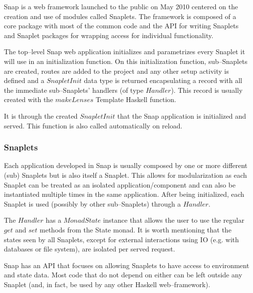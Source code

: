 Snap is a web framework launched to the public on May 2010 centered on the creation and use of modules called Snaplets.
The framework is composed of a core package with most of the common code and the API for writing Snaplets and Snaplet packages for wrapping access for individual functionality.

The top--level Snap web application initializes and parametrizes every Snaplet it will use in an initialization function.
On this initialization function, sub--Snaplets are created, routes are added to the project and any other setup activity is defined and a $ SnapletInit $ data type is returned encapsulating a record with all the immediate sub--Snaplets' handlers (of type $ Handler $).
This record is usually created with the $ makeLenses $ Template Haskell function.

It is through the created $ SnapletInit $ that the Snap application is initialized and served.
This function is also called automatically on reload.

\subsubsection{Snaplets}

Each application developed in Snap is usually composed by one or more different (sub) Snaplets but is also itself a Snaplet.
This allows for modularization as each Snaplet can be treated as an isolated application/component and can also be instantiated multiple times in the same application.
After being initialized, each Snaplet is used (possibly by other sub--Snaplets) through a $ Handler $.

The $ Handler $ has a $ MonadState $ instance that allows the user to use the regular $ get $ and $ set $ methods from the State monad.
It is worth mentioning that the states seen by all Snaplets, except for external interactions using IO (e.g. with databases or file system), are isolated per served request.

Snap has an API that focuses on allowing Snaplets to have access to environment and state data.
Most code that do not depend on either can be left outside any Snaplet (and, in fact, be used by any other Haskell web--framework).
